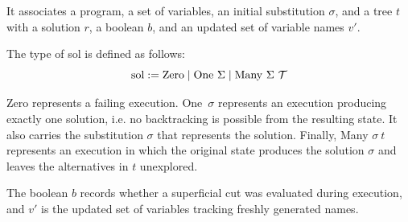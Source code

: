 \documentclass[sigplan,10pt,anonymous,review]{acmart}
\begin{document}
It associates a program, a set of variables, an initial substitution $\sigma$, and a
tree $t$ with a solution $r$, a boolean $b$, and an updated set of variable
names $v'$.

The type of sol is defined as follows:
%
$$\mathrm{sol} := \mathrm{Zero} \mid \mathrm{One}\ \Sigma \mid \mathrm{Many}\ \Sigma\ \TREE$$

Zero represents a failing execution. One\ $\sigma$ represents an execution
producing exactly one solution, i.e. no backtracking is possible from the resulting
state. It also carries the substitution $\sigma$ that represents the solution.
Finally, Many $\sigma\ t$ represents an execution in which the
original state produces the solution $\sigma$ and leaves the alternatives
in $t$ unexplored.

The boolean $b$ records whether a superficial cut was evaluated during execution,
and $v'$ is the updated set of variables tracking freshly generated names.
\end{document}
